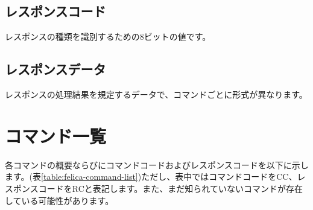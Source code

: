 \documentclass[a4paper]{report}
\begin{document}
\subsection{レスポンスコード}

レスポンスの種類を識別するための8ビットの値です。

\subsection{レスポンスデータ}

レスポンスの処理結果を規定するデータで、コマンドごとに形式が異なります。

\section{コマンド一覧}

各コマンドの概要ならびにコマンドコードおよびレスポンスコードを以下に示します。(表\ref{table:felica-command-list})ただし、表中ではコマンドコードをCC、レスポンスコードをRCと表記します。また、まだ知られていないコマンドが存在している可能性があります。
\end{document}
